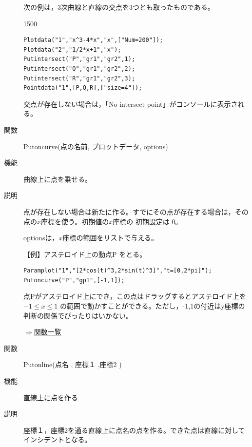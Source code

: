 \documentclass[papersize,a4paper,12pt,uplatex]{jsarticle}
\begin{document}
\begin{description}
次の例は，3次曲線と直線の交点を3つとも取ったものである。

\begin{layer}{150}{0}
\end{layer}

\begin{verbatim}
Plotdata("1","x^3-4*x","x",["Num=200"]);
Plotdata("2","1/2*x+1","x");
Putintersect("P","gr1","gr2",1);
Putintersect("Q","gr1","gr2",2);
Putintersect("R","gr1","gr2",3);
Pointdata("1",[P,Q,R],["size=4"]);
\end{verbatim}

\vspace{\baselineskip}
 交点が存在しない場合は，「No intersect point」がコンソールに表示される。

\vspace{\baselineskip}
\hypertarget{putoncurve}{}
\item[関数]Putoncurve(点の名前, プロットデータ, options)
\item[機能]曲線上に点を乗せる。
\item[説明]点が存在しない場合は新たに作る。すでにその点が存在する場合は，その点の$x$座標を使う。初期値の$x$座標の 初期設定は 0。

optionsは，$x$座標の範囲をリストで与える。

\vspace{\baselineskip}
【例】アステロイド上の動点P をとる。
\begin{verbatim}
Paramplot("1","[2*cos(t)^3,2*sin(t)^3]","t=[0,2*pi]");
Putoncurve("P","gp1",[-1,1]); 
\end{verbatim}
点Pがアステロイド上にでき，この点はドラッグするとアステロイド上を $-1 \leq x\leq 1$ の範囲で動かすことができる。ただし，-1,1の付近はy座標の判断の関係でぴったりはいかない。

 \begin{center} \scalebox{0.9}{} \end{center}

\begin{flushright}\hyperlink{functionlist}{$\Rightarrow$関数一覧}\end{flushright}

\hypertarget{putonline}{}
\item[関数]Putonline(点名 , 座標１ ,座標2 )
\item[機能]直線上に点を作る
\item[説明]座標１，座標2を通る直線上に点名の点を作る。できた点は直線に対してインシデントとなる。


\end{description}
\end{document}
